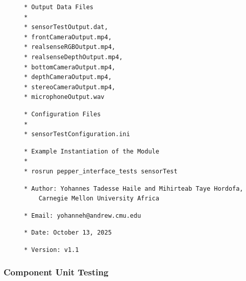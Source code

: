 \documentclass{CSSRforAfrica}
\newcommand{\checkboxChecked}{\fbox{\ding{51}}} %
\begin{document}
\begin{description}
\item[\checkboxChecked] 
 {\small 
\begin{verbatim}
* Output Data Files
*
* sensorTestOutput.dat, 
* frontCameraOutput.mp4,
* realsenseRGBOutput.mp4,
* realsenseDepthOutput.mp4,
* bottomCameraOutput.mp4,
* depthCameraOutput.mp4,
* stereoCameraOutput.mp4,
* microphoneOutput.wav
\end{verbatim}}

\item[\checkboxChecked] 
 {\small 
\begin{verbatim}
* Configuration Files
*
* sensorTestConfiguration.ini
\end{verbatim}}

\item[\checkboxChecked] 
 {\small 
\begin{verbatim}
* Example Instantiation of the Module
*
* rosrun pepper_interface_tests sensorTest
\end{verbatim}}

\item[\checkboxChecked] 
 {\small 
\begin{verbatim}
* Author: Yohannes Tadesse Haile and Mihirteab Taye Hordofa,
    Carnegie Mellon University Africa
\end{verbatim}}

\item[\checkboxChecked] 
 {\small 
\begin{verbatim}
* Email: yohanneh@andrew.cmu.edu
\end{verbatim}}

\item[\checkboxChecked] 
 {\small 
\begin{verbatim}
* Date: October 13, 2025
\end{verbatim}}

\item[\checkboxChecked] 
 {\small 
\begin{verbatim}
* Version: v1.1
\end{verbatim}}

\end{description}

\subsubsection{Component Unit Testing}
\end{document}
